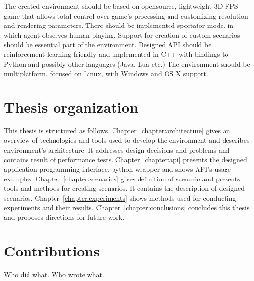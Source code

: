 The created environment should be based on opensource, lightweight 3D FPS game that allows total control over game's processing and customizing resolution and rendering parameters.
There should be implemented spectator mode, in which agent observes human playing.
Support for creation of custom scenarios should be essential part of the environment. 
Designed API should be reinforcement learning friendly and implemented in C++ with bindings to Python and possibly other languages (Java, Lua etc.)
The environment should be multiplatform, focused on Linux, with Windows and OS X support.
	
\section{Thesis organization}


This thesis is structured as follows. 
Chapter~\ref{chapter:architecture} gives an overview of technologies and tools used to develop the environment and describes environment's architecture. It addresses design decisions and problems and contains result of performance tests. 
Chapter~\ref{chapter:api} presents the designed application programming interface, python wrapper and shows API's usage examples. 
Chapter~\ref{chapter:scenarios} gives definition of scenario and presents tools and methods for creating scenarios. It contains the description of designed scenarios. 
Chapter~\ref{chapter:experiments} shows methods used for conducting experiments and their results. 
Chapter~\ref{chapter:conclusions} concludes this thesis and proposes directions for future work.

\section{Contributions}
Who did what.
Who wrote what.
